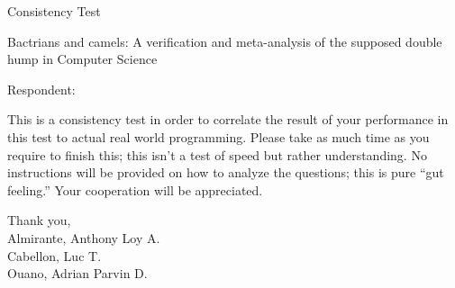\documentclass[10pt]{exam}
\begin{document}
\begin{center}
  \huge

  Consistency Test
\end{center}

\begin{center}
  \itshape
  
Bactrians and camels: A verification and meta-analysis of the supposed double hump in Computer Science  
\end{center}

\noindent Respondent:

This is a consistency test in order to correlate the result of your performance in this test to actual real world programming. Please take as much time as you require to finish this; this isn't a test of speed but rather understanding. No instructions will be provided on how to analyze the questions; this is pure ``gut feeling.'' Your cooperation will be appreciated.

\noindent Thank you, \\
Almirante, Anthony Loy A. \\
Cabellon, Luc T. \\
Ouano, Adrian Parvin D.
\end{document}
